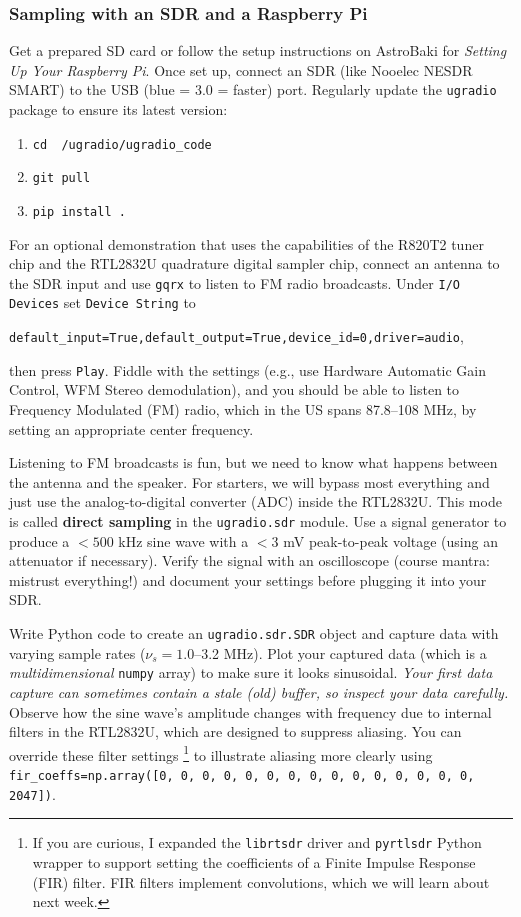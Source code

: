 \documentclass[11pt,preprint]{aastex}
\begin{document}
\subsubsection{Sampling with an SDR and a Raspberry Pi}

Get a prepared SD card or follow the setup instructions on AstroBaki for {\it Setting Up Your Raspberry Pi}. Once set up, connect an SDR (like Nooelec NESDR SMART) to the USB (blue = 3.0 = faster) port. Regularly update the {\tt ugradio} package to ensure its latest version:
\begin{enumerate}
    \item {\tt cd ~/ugradio/ugradio\_code}
    \item {\tt git pull}
    \item {\tt pip install .}
\end{enumerate}

For an optional demonstration that uses the capabilities of the R820T2 tuner chip and the RTL2832U quadrature digital sampler chip, connect an antenna to the SDR input and use {\tt gqrx} to listen to FM radio broadcasts. 
Under {\tt I/O Devices} set {\tt Device String} to 

\noindent
{\tt default\_input=True,default\_output=True,device\_id=0,driver=audio}, 

\noindent
then press {\tt Play}. 
Fiddle with the settings (e.g., use Hardware Automatic Gain Control, WFM Stereo demodulation), and
you should be able to listen to Frequency Modulated (FM) 
radio, which in the US spans 87.8--108 MHz, by setting an appropriate center frequency.

Listening to FM broadcasts is fun, but we need to know what happens between the antenna and the speaker.
For starters, we will bypass most everything and just use the analog-to-digital converter (ADC) inside the RTL2832U.
This mode is called {\bf direct sampling} in the {\tt ugradio.sdr} module.
Use a signal generator to produce a $<500$ kHz sine wave with a $<3$ mV peak-to-peak voltage (using an attenuator if necessary).
Verify the signal with an oscilloscope (course mantra: mistrust everything!) and document your settings before plugging it into your SDR.

Write Python code to create an {\tt ugradio.sdr.SDR} object and capture data with varying sample rates ($\nu_s = 1.0$--3.2 MHz).
Plot your captured data (which is a {\it multidimensional} {\tt numpy} array) to make sure it looks sinusoidal.
{\it Your first data capture can sometimes contain a stale (old) buffer, so inspect your data carefully.}
Observe how the sine wave's amplitude changes with frequency due to internal filters in the RTL2832U, which are designed to suppress aliasing.
You can override these filter settings
\footnote{If you are curious, 
I expanded the {\tt librtsdr} driver and {\tt pyrtlsdr} Python wrapper
to support setting the coefficients of a Finite Impulse Response
(FIR) filter. FIR filters implement convolutions, which we will
learn about next week.}
to illustrate aliasing more clearly using
{\tt fir\_coeffs=np.array([0, 0, 0, 0, 0, 0, 0, 0, 0, 0, 0, 0, 0, 0, 0, 2047])}.
\end{document}
